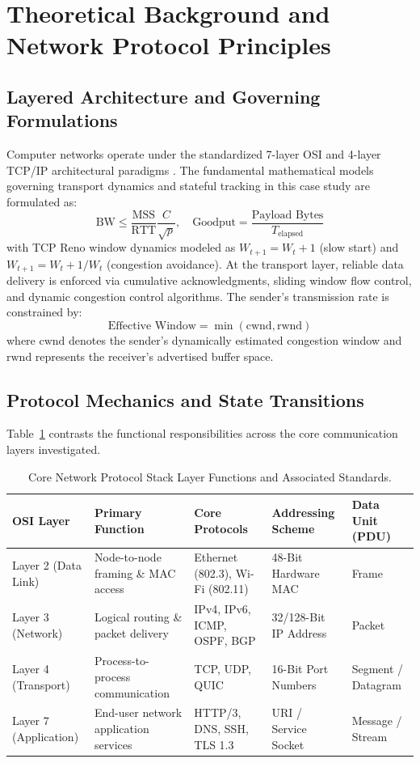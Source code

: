 \section{Theoretical Background and Network Protocol Principles}

\subsection{Layered Architecture and Governing Formulations}
Computer networks operate under the standardized 7-layer OSI and 4-layer TCP/IP architectural paradigms \cite{stallings2017data}. The fundamental mathematical models governing transport dynamics and stateful tracking in this case study are formulated as:
\begin{equation}
  \text{BW} \le \frac{\text{MSS}}{\text{RTT}} \frac{C}{\sqrt{p}}, \quad \text{Goodput} = \frac{\text{Payload Bytes}}{T_{\text{elapsed}}}
\label{eq:core_math}
\end{equation}
with TCP Reno window dynamics modeled as $W_{t+1} = W_t + 1$ (slow start) and $W_{t+1} = W_t + 1/W_t$ (congestion avoidance).
At the transport layer, reliable data delivery is enforced via cumulative acknowledgments, sliding window flow control, and dynamic congestion control algorithms. The sender's transmission rate is constrained by:
\begin{equation}
  \text{Effective Window} = \min(\text{cwnd}, \text{rwnd})
\end{equation}
where $\text{cwnd}$ denotes the sender's dynamically estimated congestion window and $\text{rwnd}$ represents the receiver's advertised buffer space.

\subsection{Protocol Mechanics and State Transitions}
Table~\ref{tab:layer_comp} contrasts the functional responsibilities across the core communication layers investigated.
\begin{table}[H]
\centering
\caption{Core Network Protocol Stack Layer Functions and Associated Standards.}
\label{tab:layer_comp}
\begin{tabularx}{\linewidth}{lXXXX}
\toprule
\textbf{OSI Layer} & \textbf{Primary Function} & \textbf{Core Protocols} & \textbf{Addressing Scheme} & \textbf{Data Unit (PDU)} \\
\midrule
Layer 2 (Data Link) & Node-to-node framing \& MAC access & Ethernet (802.3), Wi-Fi (802.11) & 48-Bit Hardware MAC & Frame \\
Layer 3 (Network) & Logical routing \& packet delivery & IPv4, IPv6, ICMP, OSPF, BGP & 32/128-Bit IP Address & Packet \\
Layer 4 (Transport) & Process-to-process communication & TCP, UDP, QUIC & 16-Bit Port Numbers & Segment / Datagram \\
Layer 7 (Application) & End-user network application services & HTTP/3, DNS, SSH, TLS 1.3 & URI / Service Socket & Message / Stream \\
\bottomrule
\end{tabularx}
\end{table}

